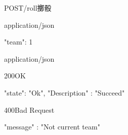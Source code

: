 \documentclass[12pt]{NGPLB}
\begin{document}
\begin{apiRoute}{POST}{/roll}{擲骰}
\begin{routeParameter}
\end{routeParameter}
\begin{routeRequest}{application/json}
\begin{routeRequestBody}
{
	"team": 1
}
\end{routeRequestBody}
\end{routeRequest}

\begin{routeResponse}{application/json}
\begin{routeResponseItem}{200}{OK}
\begin{routeResponseItemBody}
{
	"state": "Ok",
	"Description" : "Succeed"
}
\end{routeResponseItemBody}
\end{routeResponseItem}

\begin{routeResponseItem}{400}{Bad Request}
\begin{routeResponseItemBody}
{
    "message" : "Not current team"
}
\end{routeResponseItemBody}
\end{routeResponseItem}
\end{routeResponse}

\end{apiRoute}
\end{document}

